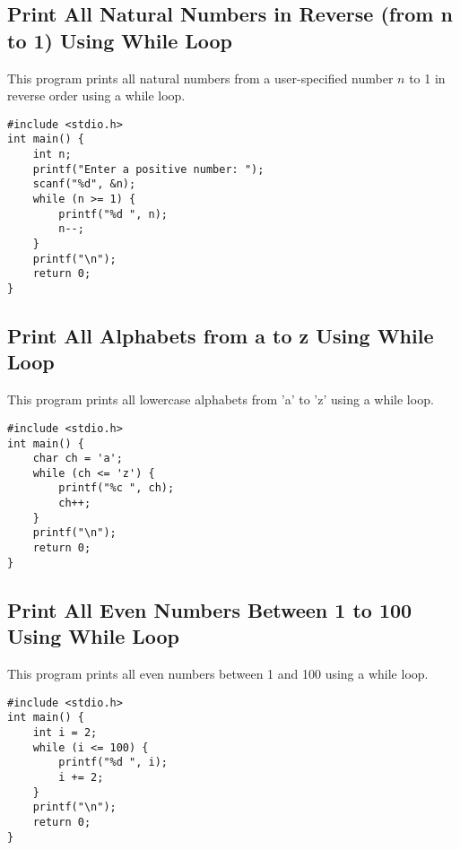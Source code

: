 \documentclass[a4paper,12pt]{article}
\begin{document}
\newpage

\subsection{Print All Natural Numbers in Reverse (from n to 1) Using While Loop}
This program prints all natural numbers from a user-specified number \(n\) to 1 in reverse order using a while loop.

\begin{lstlisting}[caption={Print All Natural Numbers in Reverse (from n to 1) Using While Loop}]
#include <stdio.h>
int main() {
    int n;
    printf("Enter a positive number: ");
    scanf("%d", &n);
    while (n >= 1) {
        printf("%d ", n);
        n--;
    }
    printf("\n");
    return 0;
}
\end{lstlisting}

\newpage

\subsection{Print All Alphabets from a to z Using While Loop}
This program prints all lowercase alphabets from 'a' to 'z' using a while loop.

\begin{lstlisting}[caption={Print All Alphabets from a to z Using While Loop}]
#include <stdio.h>
int main() {
    char ch = 'a';
    while (ch <= 'z') {
        printf("%c ", ch);
        ch++;
    }
    printf("\n");
    return 0;
}
\end{lstlisting}

\newpage

\subsection{Print All Even Numbers Between 1 to 100 Using While Loop}
This program prints all even numbers between 1 and 100 using a while loop.

\begin{lstlisting}[caption={Print All Even Numbers Between 1 to 100 Using While Loop}]
#include <stdio.h>
int main() {
    int i = 2;
    while (i <= 100) {
        printf("%d ", i);
        i += 2;
    }
    printf("\n");
    return 0;
}
\end{lstlisting}

\newpage
\end{document}
